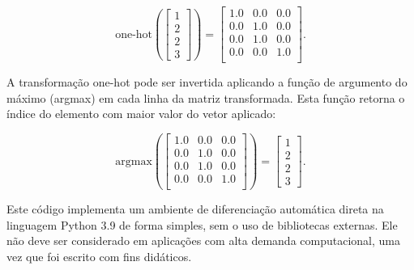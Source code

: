   \begin{equation}
    \text{one-hot} \left(
    \begin{bmatrix}
      1 \\
      2 \\
      2 \\
      3
    \end{bmatrix} \right)
    =
    \begin{bmatrix}
      1.0 & 0.0 & 0.0 \\
      0.0 & 1.0 & 0.0 \\
      0.0 & 1.0 & 0.0 \\
      0.0 & 0.0 & 1.0 \\
    \end{bmatrix}
    .
  \end{equation}

  A transformação one-hot pode ser invertida aplicando a função de argumento do máximo (argmax) em cada linha da matriz transformada. Esta função retorna o índice do elemento com maior valor do vetor aplicado:

  \begin{equation}
    \text{argmax} \left(
    \begin{bmatrix}
      1.0 & 0.0 & 0.0 \\
      0.0 & 1.0 & 0.0 \\
      0.0 & 1.0 & 0.0 \\
      0.0 & 0.0 & 1.0 \\
    \end{bmatrix} \right)
    =
    \begin{bmatrix}
      1 \\
      2 \\
      2 \\
      3
    \end{bmatrix}
    .
  \end{equation}

 \label{a:autodiff_direta}

  Este código implementa um ambiente de diferenciação automática direta na linguagem Python 3.9 de forma simples, sem o uso de bibliotecas externas. Ele não deve ser considerado em aplicações com alta demanda computacional, uma vez que foi escrito com fins didáticos.

  


 \label{a:autodiff_reversa}

